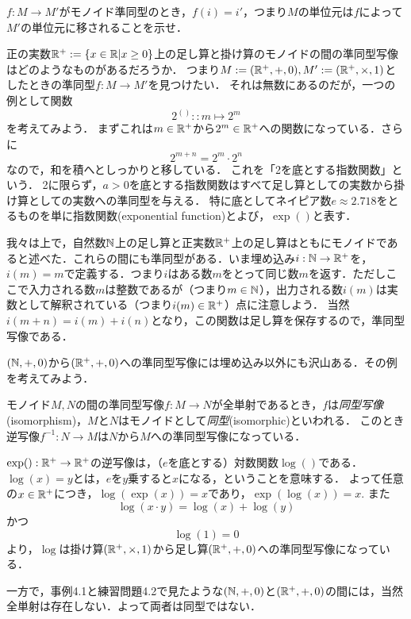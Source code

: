 \documentclass[11pt,a4paper,uplatex]{jsarticle}
\begin{document}
\begin{exercise}
    $f:M \to M'$がモノイド準同型のとき，$f(i) = i'$，つまり$M$の単位元は$f$によって$M'$の単位元に移されることを示せ．
\end{exercise}

正の実数$\mathbb{R}^+ := \{x \in \mathbb{R} | x \geq 0 \}$上の足し算と掛け算のモノイドの間の準同型写像はどのようなものがあるだろうか．
つまり$M := (\mathbb{R}^+, +, 0), M' := (\mathbb{R}^+, \times, 1)$としたときの準同型$f:M \to M'$を見つけたい．
それは無数にあるのだが，一つの例として関数
\[ 2^{()} :: m \mapsto 2^m \]
を考えてみよう．
まずこれは$m \in \mathbb{R}^+$から$2^m \in \mathbb{R}^+$への関数になっている．さらに
\[ 2^{m + n} = 2^m \cdot 2^n \]
なので，和を積へとしっかりと移している．
これを「2を底とする指数関数」という．
2に限らず，$a>0$を底とする指数関数はすべて足し算としての実数から掛け算としての実数への準同型を与える．
特に底としてネイピア数$e\approx 2.718$をとるものを単に指数関数(exponential function)とよび，$\exp()$と表す．

\begin{example}
    我々は上で，自然数$\mathbb{N}$上の足し算と正実数$\mathbb{R}^+$上の足し算はともにモノイドであると述べた．これらの間にも準同型がある．いま埋め込み$i:\mathbb{N} \to \mathbb{R}^+$を，$i(m)=m$で定義する．つまり$i$はある数$m$をとって同じ数$m$を返す．ただしここで入力される数$m$は整数であるが（つまり$m \in \mathbb{N}$），出力される数$i(m)$は実数として解釈されている（つまり$i(m) \in \mathbb{R}^+$）点に注意しよう．
    当然$i(m+n) = i(m)+i(n)$となり，この関数は足し算を保存するので，準同型写像である．
\end{example} 

\begin{exercise}
    $(\mathbb{N}, +, 0)$から$(\mathbb{R}^+, +, 0)$への準同型写像には埋め込み以外にも沢山ある．その例を考えてみよう．
\end{exercise}


\begin{dfn}[同型]
    モノイド$M, N$の間の準同型写像$f:M \to N$が全単射であるとき，$f$は\emph{同型写像}(isomorphism)，$M$と$N$はモノイドとして\emph{同型}(isomorphic)といわれる．
    このとき逆写像$f^{-1}:N \to M$は$N$から$M$への準同型写像になっている．
\end{dfn}

\begin{example}
    $\exp():\mathbb{R}^+ \to \mathbb{R}^+$の逆写像は，（$e$を底とする）対数関数$\log()$である．
    $\log(x)=y$とは，$e$を$y$乗すると$x$になる，ということを意味する．
    よって任意の$x\in\mathbb{R}^+$につき，$\log(\exp(x))=x$であり，$\exp(\log(x))=x$. また
    \[ \log(x \cdot y) = \log(x) + \log(y) \]
    かつ
    \[ \log(1) = 0 \]
    より，$\log$は掛け算$(\mathbb{R}^+, \times, 1)$から足し算$(\mathbb{R}^+, +, 0)$への準同型写像になっている．

    一方で，事例4.1と練習問題4.2で見たような$(\mathbb{N}, +, 0)$と$(\mathbb{R}^+, +, 0)$の間には，当然全単射は存在しない．よって両者は同型ではない．
\end{example}
\end{document}
